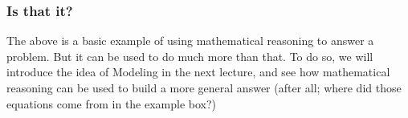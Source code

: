 \documentclass{ximeraXloud}
\begin{document}
\subsubsection*{Is that it?}

    The above is a basic example of using mathematical reasoning to answer a problem. But it can be used to do much more than that. To do so, we will introduce the idea of Modeling in the next lecture, and see how mathematical reasoning can be used to build a more general answer (after all; where did those equations come from in the example box?) 
\end{document}
